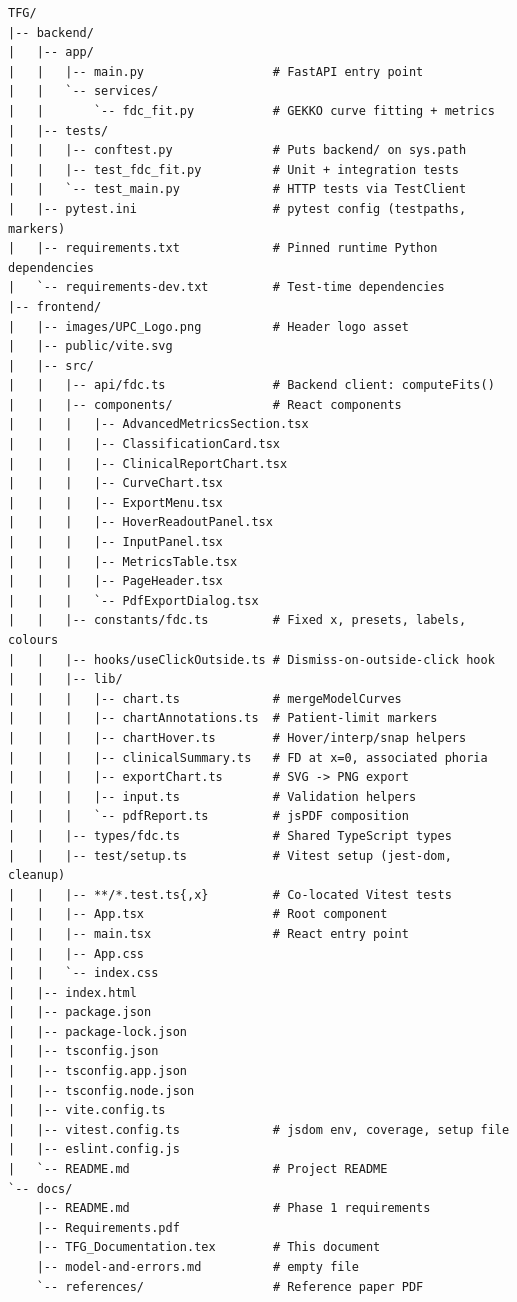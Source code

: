 \documentclass[11pt,a4paper]{article}
\begin{document}
\begin{lstlisting}
TFG/
|-- backend/
|   |-- app/
|   |   |-- main.py                  # FastAPI entry point
|   |   `-- services/
|   |       `-- fdc_fit.py           # GEKKO curve fitting + metrics
|   |-- tests/
|   |   |-- conftest.py              # Puts backend/ on sys.path
|   |   |-- test_fdc_fit.py          # Unit + integration tests
|   |   `-- test_main.py             # HTTP tests via TestClient
|   |-- pytest.ini                   # pytest config (testpaths, markers)
|   |-- requirements.txt             # Pinned runtime Python dependencies
|   `-- requirements-dev.txt         # Test-time dependencies
|-- frontend/
|   |-- images/UPC_Logo.png          # Header logo asset
|   |-- public/vite.svg
|   |-- src/
|   |   |-- api/fdc.ts               # Backend client: computeFits()
|   |   |-- components/              # React components
|   |   |   |-- AdvancedMetricsSection.tsx
|   |   |   |-- ClassificationCard.tsx
|   |   |   |-- ClinicalReportChart.tsx
|   |   |   |-- CurveChart.tsx
|   |   |   |-- ExportMenu.tsx
|   |   |   |-- HoverReadoutPanel.tsx
|   |   |   |-- InputPanel.tsx
|   |   |   |-- MetricsTable.tsx
|   |   |   |-- PageHeader.tsx
|   |   |   `-- PdfExportDialog.tsx
|   |   |-- constants/fdc.ts         # Fixed x, presets, labels, colours
|   |   |-- hooks/useClickOutside.ts # Dismiss-on-outside-click hook
|   |   |-- lib/
|   |   |   |-- chart.ts             # mergeModelCurves
|   |   |   |-- chartAnnotations.ts  # Patient-limit markers
|   |   |   |-- chartHover.ts        # Hover/interp/snap helpers
|   |   |   |-- clinicalSummary.ts   # FD at x=0, associated phoria
|   |   |   |-- exportChart.ts       # SVG -> PNG export
|   |   |   |-- input.ts             # Validation helpers
|   |   |   `-- pdfReport.ts         # jsPDF composition
|   |   |-- types/fdc.ts             # Shared TypeScript types
|   |   |-- test/setup.ts            # Vitest setup (jest-dom, cleanup)
|   |   |-- **/*.test.ts{,x}         # Co-located Vitest tests
|   |   |-- App.tsx                  # Root component
|   |   |-- main.tsx                 # React entry point
|   |   |-- App.css
|   |   `-- index.css
|   |-- index.html
|   |-- package.json
|   |-- package-lock.json
|   |-- tsconfig.json
|   |-- tsconfig.app.json
|   |-- tsconfig.node.json
|   |-- vite.config.ts
|   |-- vitest.config.ts             # jsdom env, coverage, setup file
|   |-- eslint.config.js
|   `-- README.md                    # Project README
`-- docs/
    |-- README.md                    # Phase 1 requirements
    |-- Requirements.pdf
    |-- TFG_Documentation.tex        # This document
    |-- model-and-errors.md          # empty file
    `-- references/                  # Reference paper PDF
\end{lstlisting}
\end{document}
